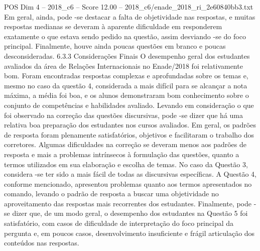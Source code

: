 \begin{textsample}{POS Dim 4 – 2018\_c6 – Score 12.00 – 2018\_c6/enade\_2018\_ri\_2e60840bb3.txt}
Em geral, ainda, pode -se destacar a falta de objetividade nas respostas, e muitas respostas medianas se deveram à aparente dificuldade em responderem exatamente o que estava sendo pedido na questão, assim desviando -se do foco principal.
Finalmente, houve ainda poucas questões em branco e poucas desconsideradas. 6.3.3 Considerações Finais O desempenho geral dos estudantes avaliados da área de Relações Internacionais no Enade/2018 foi relativamente bom.
Foram encontradas respostas complexas e aprofundadas sobre os temas e, mesmo no caso da questão 4, considerada a mais difícil para se alcançar a nota máxima, a média foi boa, e os alunos demonstraram bom conhecimento sobre o conjunto de competências e habilidades avaliado.
Levando em consideração o que foi observado na correção das questões discursivas, pode -se dizer que há uma relativa boa preparação dos estudantes nos cursos avaliados.
Em geral, os padrões de resposta foram plenamente satisfatórios, objetivos e facilitaram o trabalho dos corretores.
Algumas dificuldades na correção se deveram menos aos padrões de resposta e mais a problemas intrínsecos à formulação das questões, quanto a termos utilizados em sua elaboração e escolha de temas.
No caso da Questão 3, considera -se ter sido a mais fácil de todas as discursivas específicas.
A Questão 4, conforme mencionado, apresentou problemas quanto aos termos apresentados no comando, levando o padrão de resposta a buscar uma objetividade no aproveitamento das respostas mais recorrentes dos estudantes.
Finalmente, pode -se dizer que, de um modo geral, o desempenho dos estudantes na Questão 5 foi satisfatório, com casos de dificuldade de interpretação do foco principal da pergunta e, em poucos casos, desenvolvimento insuficiente e frágil articulação dos conteúdos nas respostas.

\end{textsample}
